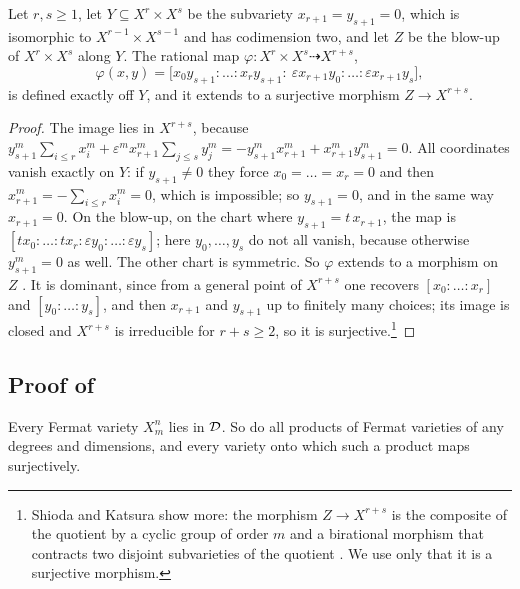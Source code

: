 \begin{proposition}\label{prop:sk}
Let $r,s\ge1$, let $Y\subseteq X^{r}\times X^{s}$ be the subvariety
$x_{r+1}=y_{s+1}=0$, which is isomorphic to $X^{r-1}\times X^{s-1}$ and has
codimension two, and let $Z$ be the blow-up of $X^{r}\times X^{s}$ along $Y$.
The rational map $\varphi\colon X^{r}\times X^{s}\dashrightarrow X^{r+s}$,
\[
  \varphi(x,y)=\bigl[x_{0}y_{s+1}:\dots:x_{r}y_{s+1}:\ \varepsilon x_{r+1}y_{0}:
  \dots:\varepsilon x_{r+1}y_{s}\bigr],
\]
is defined exactly off $Y$, and it extends to a surjective morphism
$Z\to X^{r+s}$.
\end{proposition}

\begin{proof}
The image lies in $X^{r+s}$, because
$y_{s+1}^{m}\sum_{i\le r}x_{i}^{m}+\varepsilon^{m}x_{r+1}^{m}\sum_{j\le s}
y_{j}^{m}=-y_{s+1}^{m}x_{r+1}^{m}+x_{r+1}^{m}y_{s+1}^{m}=0$. All coordinates
vanish exactly on $Y$: if $y_{s+1}\ne0$ they force $x_{0}=\dots=x_{r}=0$ and
then $x_{r+1}^{m}=-\sum_{i\le r}x_{i}^{m}=0$, which is impossible; so
$y_{s+1}=0$, and in the same way $x_{r+1}=0$. On the blow-up, on the chart
where $y_{s+1}=t\,x_{r+1}$, the map is $[t x_{0}:\dots:t x_{r}:\varepsilon
y_{0}:\dots:\varepsilon y_{s}]$; here $y_{0},\dots,y_{s}$ do not all vanish,
because otherwise $y_{s+1}^{m}=0$ as well. The other chart is symmetric. So
$\varphi$ extends to a morphism on $Z$ \cite[Lemma~1.2]{SK79}. It is
dominant, since from a general point of $X^{r+s}$ one recovers
$[x_{0}:\dots:x_{r}]$ and $[y_{0}:\dots:y_{s}]$, and then $x_{r+1}$ and
$y_{s+1}$ up to finitely many choices; its image is closed and $X^{r+s}$ is
irreducible for $r+s\ge2$, so it is surjective.\footnote{Shioda and Katsura
show more: the morphism $Z\to X^{r+s}$ is the composite of the quotient by a
cyclic group of order $m$ and a
birational morphism that contracts two disjoint subvarieties of the quotient
\cite[Theorem~1.7]{SK79}. We use only that it is a surjective morphism.}
\end{proof}

\subsection{Proof of \texorpdfstring{}{Theorem E}}\label{ssec:prooffermatcm}

\begin{theorem}\label{thm:fermatD}
Every Fermat variety $X^{n}_{m}$ lies in $\mathcal{D}$. So do all products of Fermat
varieties of any degrees and dimensions, and every variety onto which such a
product maps surjectively.
\end{theorem}

